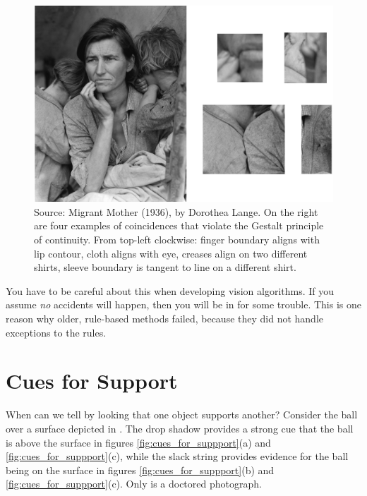 \begin{figure}[h!]
    \centerline{
        \includegraphics[width=1\linewidth]{figures/visionscience/accidents_migrant_mother.jpg}}
    \caption{Source: Migrant Mother (1936), by Dorothea Lange. On the right are four examples of coincidences that violate the Gestalt principle of continuity. From top-left clockwise: finger boundary aligns with lip contour, cloth aligns with eye, creases align on two different shirts, sleeve boundary is tangent to line on a different shirt.}
    \label{fig:visionscience:migrant_mother}
\end{figure}

You have to be careful about this when developing vision algorithms. If you assume \textit{no} accidents will happen, then you will be in for some trouble. This is one reason why older, rule-based methods failed, because they did not handle exceptions to the rules.




\section{Cues for Support}

When can we tell by looking that one object supports another?  Consider the ball over a surface depicted in \fig{\ref{fig:cues_for_suppport}}.  The drop shadow provides a strong cue that the ball is above the surface in figures \ref{fig:cues_for_suppport}(a) and \ref{fig:cues_for_suppport}(c), while the slack string provides evidence for the ball being on the surface in figures \ref{fig:cues_for_suppport}(b) and \ref{fig:cues_for_suppport}(c).
Only  is a doctored photograph.

